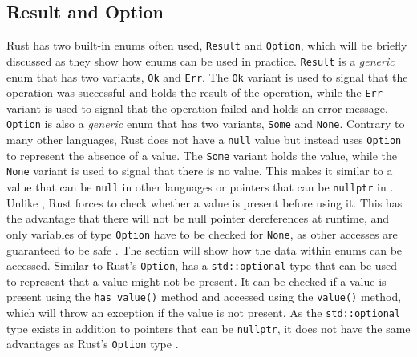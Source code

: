\subsection{Result and Option}
\noindent Rust has two built-in enums often used, \texttt{Result} and \texttt{Option}, which will be briefly discussed as they show how enums can be used in practice.
\texttt{Result} is a \textit{generic} enum that has two variants, \texttt{Ok} and \texttt{Err}.
The \texttt{Ok} variant is used to signal that the operation was successful and holds the result of the operation, while the \texttt{Err} variant is used to signal that the operation failed and holds an error message.
\texttt{Option} is also a \textit{generic} enum that has two variants, \texttt{Some} and \texttt{None}.
Contrary to many other languages, Rust does not have a \texttt{null} value but instead uses \texttt{Option} to represent the absence of a value.
The \texttt{Some} variant holds the value, while the \texttt{None} variant is used to signal that there is no value.
This makes it similar to a value that can be \texttt{null} in other languages or pointers that can be \texttt{nullptr} in \Cpp.
Unlike \Cpp, Rust forces to check whether a value is present before using it.
This has the advantage that there will not be null pointer dereferences at runtime, and only variables of type \texttt{Option} have to be checked for \texttt{None}, as other accesses are guaranteed to be safe \cite[236-237]{Blandy_Jim2021-07-20} \cite[Chapter~6.1]{rustbook}.
The  section will show how the data within enums can be accessed.
Similar to Rust's \texttt{Option}, \Cpp has a \texttt{std::optional} type that can be used to represent that a value might not be present.
It can be checked if a value is present using the \texttt{has\_value()} method and accessed using the \texttt{value()} method, which will throw an exception if the value is not present.
As the \texttt{std::optional} type exists in addition to pointers that can be \texttt{nullptr}, it does not have the same advantages as Rust's \texttt{Option} type \cite{stdoptional}.


